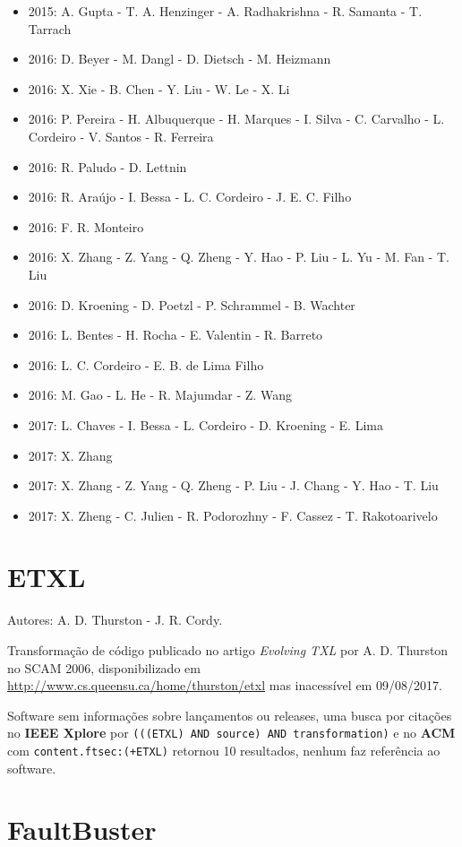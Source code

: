 \begin{itemize}
\item 2015: A. Gupta - T. A. Henzinger - A. Radhakrishna - R. Samanta - T. Tarrach
\item 2016: D. Beyer - M. Dangl - D. Dietsch - M. Heizmann
\item 2016: X. Xie - B. Chen - Y. Liu - W. Le - X. Li
\item 2016: P. Pereira - H. Albuquerque - H. Marques - I. Silva - C. Carvalho - L. Cordeiro - V. Santos - R. Ferreira
\item 2016: R. Paludo - D. Lettnin
\item 2016: R. Araújo - I. Bessa - L. C. Cordeiro - J. E. C. Filho
\item 2016: F. R. Monteiro
\item 2016: X. Zhang - Z. Yang - Q. Zheng - Y. Hao - P. Liu - L. Yu - M. Fan - T. Liu
\item 2016: D. Kroening - D. Poetzl - P. Schrammel - B. Wachter
\item 2016: L. Bentes - H. Rocha - E. Valentin - R. Barreto
\item 2016: L. C. Cordeiro - E. B. de Lima Filho
\item 2016: M. Gao - L. He - R. Majumdar - Z. Wang
\item 2017: L. Chaves - I. Bessa - L. Cordeiro - D. Kroening - E. Lima
\item 2017: X. Zhang
\item 2017: X. Zhang - Z. Yang - Q. Zheng - P. Liu - J. Chang - Y. Hao - T. Liu
\item 2017: X. Zheng - C. Julien - R. Podorozhny - F. Cassez - T. Rakotoarivelo
\end{itemize}

\section{ETXL}

Autores:
A. D. Thurston - J. R. Cordy.

Transformação de código
publicado no artigo {\it Evolving TXL}
por A. D. Thurston
no SCAM 2006,
disponibilizado em \url{http://www.cs.queensu.ca/home/thurston/etxl}
mas inacessível em 09/08/2017.

Software sem informações sobre lançamentos ou releases,
uma busca por citações no {\bf IEEE Xplore} por
\texttt{(((ETXL) AND source) AND transformation)}
e no {\bf ACM} com
\texttt{content.ftsec:(+ETXL)}
retornou
10 resultados,
nenhum faz referência ao software.


\section{FaultBuster}

